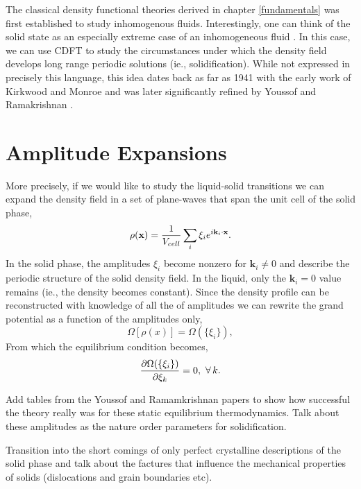 The classical density functional theories derived in chapter \ref{fundamentals}
was first established to study inhomogenous fluids.  Interestingly, one can
think of the solid state as an especially extreme case of an inhomogeneous fluid
\cite{HANSEN-CH6}.  In this case, we can use CDFT to study the circumstances
under which the density field develops long range periodic solutions (ie.,
solidification).  While not expressed in precisely this language, this idea
dates back as far as 1941 with the early work of Kirkwood and Monroe
\cite{KIRKWOOD_MONROE41} and was later significantly refined by Youssof and
Ramakrishnan \cite{RAMAKRISHNAN79}.

\section{Amplitude Expansions} %

More precisely, if we would like to study the liquid-solid transitions we can
expand the density field in a set of plane-waves that span the unit cell of the
solid phase,
%
\begin{equation} \rho(\mathbf{x}) = \frac{1}{V_{cell}} \sum_i \xi_i e^{i
\mathbf{k}_i \cdot \mathbf{x}}.  \end{equation}
%
In the solid phase, the amplitudes $\xi_i$ become nonzero for $\mathbf{k}_i \ne
0$ and describe the periodic structure of the solid density field.  In the
liquid, only the $\mathbf{k}_i = 0$ value remains (ie., the density becomes
constant).  Since the density profile can be reconstructed with knowledge of all
the of amplitudes we can rewrite the grand potential as a function of the
amplitudes only, 
%
\begin{equation} \Omega[\rho(x)] = \Omega(\lbrace\xi_i\rbrace), \end{equation}
%
From which the equilibrium condition becomes,
%
\begin{equation} \frac{\partial \Omega(\lbrace\xi_i\rbrace)}{\partial \xi_k} = 0,
\,\,\forall \,k.  \end{equation}
%

{ \color{ForestGreen} { \bfseries
    
    Add tables from the Youssof and Ramamkrishnan papers to show how successful 
    the theory really was for these static equilibrium thermodynamics. Talk about
    these amplitudes as the nature order parameters for solidification.
    
    Transition into the short comings of only perfect crystalline descriptions of the
    solid phase and talk about the factures that influence the mechanical properties
    of solids (dislocations and grain boundaries etc).}}

